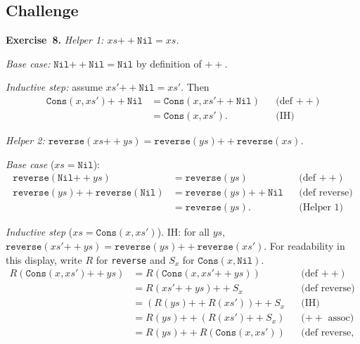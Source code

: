 \documentclass[11pt]{article}
\begin{document}
\subsection*{Challenge}

\textbf{Exercise~8.}
\emph{Helper 1: $xs \mathbin{++} \texttt{Nil} = xs$.}

\emph{Base case:} $\texttt{Nil} \mathbin{++} \texttt{Nil} = \texttt{Nil}$ by definition of $\mathbin{++}$. \checkmark

\emph{Inductive step:} assume $xs' \mathbin{++} \texttt{Nil} = xs'$. Then
\begin{align*}
  \texttt{Cons}(x, xs') \mathbin{++} \texttt{Nil} &= \texttt{Cons}(x, xs' \mathbin{++} \texttt{Nil}) && \text{(def $\mathbin{++}$)} \\
                                                   &= \texttt{Cons}(x, xs'). && \text{(IH)}
\end{align*}
\checkmark

\emph{Helper 2: $\texttt{reverse}(xs \mathbin{++} ys) = \texttt{reverse}(ys) \mathbin{++} \texttt{reverse}(xs)$.}

\emph{Base case} ($xs = \texttt{Nil}$):
\begin{align*}
  \texttt{reverse}(\texttt{Nil} \mathbin{++} ys) &= \texttt{reverse}(ys) && \text{(def $\mathbin{++}$)} \\
  \texttt{reverse}(ys) \mathbin{++} \texttt{reverse}(\texttt{Nil}) &= \texttt{reverse}(ys) \mathbin{++} \texttt{Nil} && \text{(def reverse)} \\
    &= \texttt{reverse}(ys). && \text{(Helper 1)}
\end{align*}
\checkmark

\emph{Inductive step} ($xs = \texttt{Cons}(x, xs')$). IH: for all $ys$,
$\texttt{reverse}(xs' \mathbin{++} ys)
 = \texttt{reverse}(ys) \mathbin{++} \texttt{reverse}(xs')$.
For readability in this display, write $R$ for \texttt{reverse} and
$S_x$ for $\texttt{Cons}(x, \texttt{Nil})$.
\begin{align*}
  R(\texttt{Cons}(x, xs') \mathbin{++} ys)
    &= R(\texttt{Cons}(x, xs' \mathbin{++} ys)) && \text{(def $\mathbin{++}$)} \\
    &= R(xs' \mathbin{++} ys) \mathbin{++} S_x && \text{(def reverse)} \\
    &= (R(ys) \mathbin{++} R(xs')) \mathbin{++} S_x && \text{(IH)} \\
    &= R(ys) \mathbin{++} (R(xs') \mathbin{++} S_x) && \text{($\mathbin{++}$ assoc)} \\
    &= R(ys) \mathbin{++} R(\texttt{Cons}(x, xs')) && \text{(def reverse, backward)}
\end{align*}
\checkmark
\end{document}
